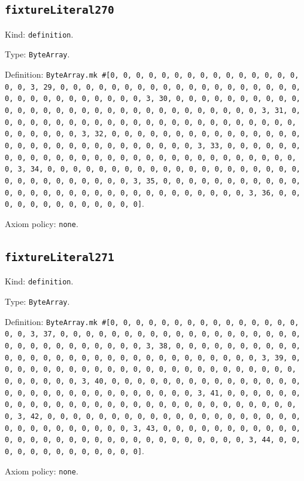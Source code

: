\documentclass[11pt]{article}
\begin{document}
\subsection*{\texttt{fixtureLiteral270}}
\noindent Kind: \texttt{definition}.\par
\noindent Type: \texttt{ByteArray}.\par
\noindent Definition: \texttt{ByteArray.mk \#[0, 0, 0, 0, 0, 0, 0, 0, 0, 0, 0, 0, 0, 0, 0, 0, 0, 3, 29, 0, 0, 0, 0, 0, 0, 0, 0, 0, 0, 0, 0, 0, 0, 0, 0, 0, 0, 0, 0, 0, 0, 0, 0, 0, 0, 0, 0, 0, 0, 3, 30, 0, 0, 0, 0, 0, 0, 0, 0, 0, 0, 0, 0, 0, 0, 0, 0, 0, 0, 0, 0, 0, 0, 0, 0, 0, 0, 0, 0, 0, 0, 3, 31, 0, 0, 0, 0, 0, 0, 0, 0, 0, 0, 0, 0, 0, 0, 0, 0, 0, 0, 0, 0, 0, 0, 0, 0, 0, 0, 0, 0, 0, 0, 3, 32, 0, 0, 0, 0, 0, 0, 0, 0, 0, 0, 0, 0, 0, 0, 0, 0, 0, 0, 0, 0, 0, 0, 0, 0, 0, 0, 0, 0, 0, 0, 3, 33, 0, 0, 0, 0, 0, 0, 0, 0, 0, 0, 0, 0, 0, 0, 0, 0, 0, 0, 0, 0, 0, 0, 0, 0, 0, 0, 0, 0, 0, 0, 3, 34, 0, 0, 0, 0, 0, 0, 0, 0, 0, 0, 0, 0, 0, 0, 0, 0, 0, 0, 0, 0, 0, 0, 0, 0, 0, 0, 0, 0, 0, 0, 3, 35, 0, 0, 0, 0, 0, 0, 0, 0, 0, 0, 0, 0, 0, 0, 0, 0, 0, 0, 0, 0, 0, 0, 0, 0, 0, 0, 0, 0, 0, 0, 3, 36, 0, 0, 0, 0, 0, 0, 0, 0, 0, 0, 0, 0, 0]}.\par
\noindent Axiom policy: \texttt{none}.\par
\subsection*{\texttt{fixtureLiteral271}}
\noindent Kind: \texttt{definition}.\par
\noindent Type: \texttt{ByteArray}.\par
\noindent Definition: \texttt{ByteArray.mk \#[0, 0, 0, 0, 0, 0, 0, 0, 0, 0, 0, 0, 0, 0, 0, 0, 0, 3, 37, 0, 0, 0, 0, 0, 0, 0, 0, 0, 0, 0, 0, 0, 0, 0, 0, 0, 0, 0, 0, 0, 0, 0, 0, 0, 0, 0, 0, 0, 0, 3, 38, 0, 0, 0, 0, 0, 0, 0, 0, 0, 0, 0, 0, 0, 0, 0, 0, 0, 0, 0, 0, 0, 0, 0, 0, 0, 0, 0, 0, 0, 0, 3, 39, 0, 0, 0, 0, 0, 0, 0, 0, 0, 0, 0, 0, 0, 0, 0, 0, 0, 0, 0, 0, 0, 0, 0, 0, 0, 0, 0, 0, 0, 0, 3, 40, 0, 0, 0, 0, 0, 0, 0, 0, 0, 0, 0, 0, 0, 0, 0, 0, 0, 0, 0, 0, 0, 0, 0, 0, 0, 0, 0, 0, 0, 0, 3, 41, 0, 0, 0, 0, 0, 0, 0, 0, 0, 0, 0, 0, 0, 0, 0, 0, 0, 0, 0, 0, 0, 0, 0, 0, 0, 0, 0, 0, 0, 0, 3, 42, 0, 0, 0, 0, 0, 0, 0, 0, 0, 0, 0, 0, 0, 0, 0, 0, 0, 0, 0, 0, 0, 0, 0, 0, 0, 0, 0, 0, 0, 0, 3, 43, 0, 0, 0, 0, 0, 0, 0, 0, 0, 0, 0, 0, 0, 0, 0, 0, 0, 0, 0, 0, 0, 0, 0, 0, 0, 0, 0, 0, 0, 0, 3, 44, 0, 0, 0, 0, 0, 0, 0, 0, 0, 0, 0, 0, 0]}.\par
\noindent Axiom policy: \texttt{none}.\par
\end{document}
